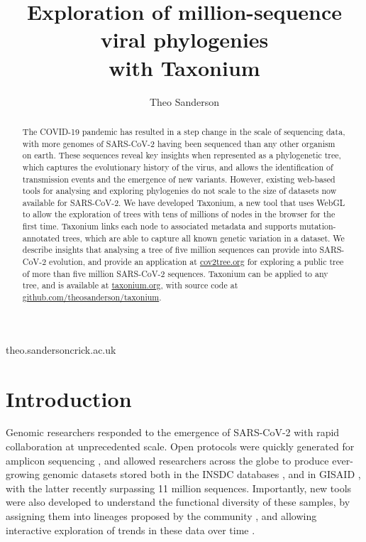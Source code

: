 
\title{Exploration of million-sequence viral phylogenies \\with Taxonium}

\author[1]{Theo Sanderson }

\date{}

\maketitle

\begin{abstract}
The COVID-19 pandemic has resulted in a step change in the scale of sequencing data, with more genomes of SARS-CoV-2 having been sequenced than any other organism on earth. These sequences reveal key insights when represented as a phylogenetic tree, which captures the evolutionary history of the virus, and allows the identification of transmission events and the emergence of new variants. However, existing web-based tools for analysing and exploring phylogenies do not scale to the size of datasets now available for SARS-CoV-2. We have developed Taxonium, a new tool that uses WebGL to allow the exploration of trees with tens of millions of nodes in the browser for the first time. Taxonium links each node to associated metadata and supports mutation-annotated trees, which are able to capture all known genetic variation in a dataset. We describe insights that analysing a tree of five million sequences can provide into SARS-CoV-2 evolution, and provide an application at \href{http://cov2tree.org}{cov2tree.org} for exploring a public tree of more than five million SARS-CoV-2 sequences. Taxonium can be applied to any tree, and is available at \href{http://taxonium.org}{taxonium.org}, with source code at \href{https://github.com/theosanderson/taxonium}{github.com/theosanderson/taxonium}.


\end{abstract}


\begin{corrauthor}
theo.sanderson\at crick.ac.uk
\end{corrauthor}

\section*{Introduction}\label{s:introduction}

Genomic researchers responded to the emergence of SARS-CoV-2 with rapid collaboration at unprecedented scale. Open protocols were quickly generated for amplicon sequencing \citep{Tyson2020}, and allowed researchers across the globe to produce ever-growing genomic datasets stored both in the INSDC databases \citep{insdc}, and in GISAID \citep{shu2017gisaid}, with the latter recently surpassing 11 million sequences. Importantly, new tools were also developed to understand the functional diversity of these samples, by assigning them into lineages proposed by the community \citep{rambaut2020dynamic, o2021assignment}, and allowing interactive exploration of trends in these data over time \citep{hodcroft_2021, chen2022cov, outbreakinfo}.


